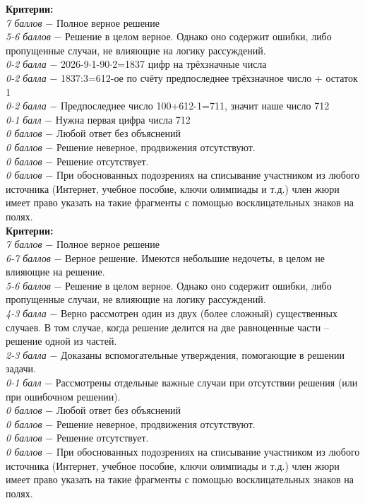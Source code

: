 \newpage


 \textbf{Критерии:} \\
\textit{7 баллов} $-$ Полное верное решение\\
\textit{5-6 баллов} $-$ Решение в целом верное. Однако оно содержит ошибки, либо пропущенные случаи, не влияющие на логику рассуждений.\\
\textit{0-2 балла} $-$ 2026-9$\cdot$1-90$\cdot$2=1837 цифр на трёхзначные числа\\
\textit{0-2 балла} $-$ 1837:3=612-ое по счёту предпоследнее трёхзначное число + остаток 1\\
\textit{0-2 балла} $-$ Предпоследнее число 100+612-1=711, значит наше число 712\\
\textit{0-1 балл} $-$ Нужна первая цифра числа 712\\
\textit{0 баллов} $-$ Любой ответ без объяснений\\
\textit{0 баллов} $-$ Решение неверное, продвижения отсутствуют.\\
\textit{0 баллов} $-$ Решение отсутствует.\\
\textit{0 баллов} $-$ При обоснованных подозрениях на списывание участником из любого источника (Интернет, учебное пособие, ключи олимпиады и т.д.) член жюри имеет право указать на такие фрагменты с помощью восклицательных знаков на полях.\\

 \textbf{Критерии:} \\
\textit{7 баллов} $-$ Полное верное решение\\
\textit{6-7 баллов} $-$ Верное решение. Имеются небольшие недочеты, в целом не влияющие на решение.\\
\textit{5-6 баллов} $-$ Решение в целом верное. Однако оно содержит ошибки, либо пропущенные случаи, не влияющие на логику рассуждений.\\
\textit{4-3 балла} $-$ Верно рассмотрен один из двух (более сложный) существенных случаев. В том случае, когда решение делится на две равноценные части – решение одной из частей. 
\\
\textit{2-3 балла} $-$ Доказаны вспомогательные утверждения, помогающие в решении задачи.
\\
\textit{0-1 балл} $-$ Рассмотрены отдельные важные случаи при отсутствии решения (или при ошибочном решении).\\
\textit{0 баллов} $-$ Любой ответ без объяснений\\
\textit{0 баллов} $-$ Решение неверное, продвижения отсутствуют.\\
\textit{0 баллов} $-$ Решение отсутствует.\\
\textit{0 баллов} $-$ При обоснованных подозрениях на списывание участником из любого источника (Интернет, учебное пособие, ключи олимпиады и т.д.) член жюри имеет право указать на такие фрагменты с помощью восклицательных знаков на полях. \\